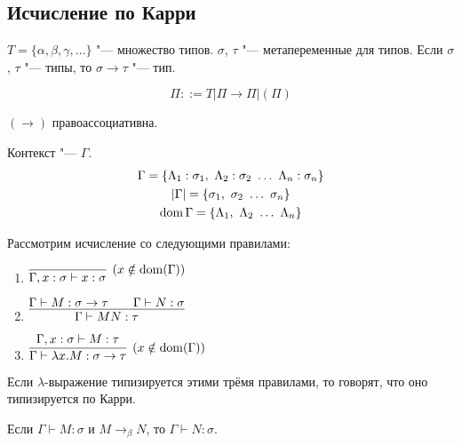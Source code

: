 \subsection{\texorpdfstring{Исчисление по Карри}{Curry-style}}

\begin{definition}[тип]
    $T = \{\alpha, \beta, \gamma, \ldots\}$ "--- множество типов.
    $\sigma$, $\tau$ "--- метапеременные для типов.
    Если $\sigma$, $\tau$ "--- типы, то $\sigma \rightarrow \tau$ "--- тип.
    \begin{bnf}
    \[
        \Pi ::= T | \Pi \rightarrow \Pi | (\Pi)
    \]
    \end{bnf}
    $\left(\rightarrow\right)$ правоассоциативна.
\end{definition}

\begin{definition}[контекст] Контекст "--- $\Gamma$.
\begin{gather*}
    \Gamma = \{ \Lambda_{1} : \sigma_{1},\ \Lambda_{2} : \sigma_{2}\ \ldots\ \Lambda_{n} : \sigma_{n} \} \\
    \abs{\Gamma} = \{ \sigma_{1},\ \sigma_{2}\ \ldots\ \sigma_{n} \} \\
    \dom \Gamma = \{ \Lambda_{1},\ \Lambda_{2}\ \ldots\ \Lambda_{n} \}
\end{gather*}
\end{definition}

\begin{definition}
    Рассмотрим исчисление со следующими правилами:
    \begin{enumerate}
        \item $\infer[(x \notin \dom(\Gamma))]
            {\Gamma, x:\sigma \vdash x:\sigma}
            {}$
        \item $\infer[]
            {\Gamma \vdash M N : \tau}
            {\Gamma \vdash M:\sigma \rightarrow \tau && \Gamma \vdash N:\sigma}$
        \item $\infer[(x \notin \dom(\Gamma))]
            {\Gamma \vdash \lambda x . M : \sigma \rightarrow \tau}
            {\Gamma, x : \sigma \vdash M : \tau}$
    \end{enumerate}
    Если $\lambda$-выражение типизируется этими трёмя правилами, то говорят, что оно типизируется по Карри.
\end{definition}

\begin{lemma}
    Если $\Gamma \vdash M : \sigma$ и $M \rightarrow_{\beta}N$, то $\Gamma \vdash N : \sigma$.
\end{lemma}

